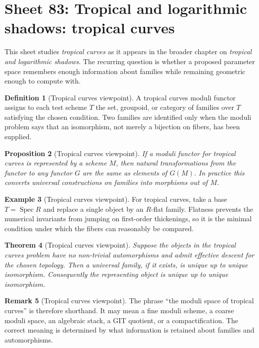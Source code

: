 \documentclass[11pt]{amsart}
\newtheorem{theorem}{Theorem}[section]
\newtheorem{proposition}[theorem]{Proposition}
\theoremstyle{definition}
\newtheorem{definition}[theorem]{Definition}
\newtheorem{example}[theorem]{Example}
\newtheorem{remark}[theorem]{Remark}
\newcommand{\Spec}{\operatorname{Spec}}
\begin{document}
\section{Sheet 83: Tropical and logarithmic shadows: tropical curves}
This sheet studies \emph{tropical curves} as it appears in the broader chapter on \emph{tropical and logarithmic shadows}.  The recurring question is whether a proposed parameter space remembers enough information about families while remaining geometric enough to compute with.
\begin{definition}[Tropical curves viewpoint]
A tropical curves moduli functor assigns to each test scheme $T$ the set, groupoid, or category of families over $T$ satisfying the chosen condition.  Two families are identified only when the moduli problem says that an isomorphism, not merely a bijection on fibers, has been supplied.
\end{definition}
\begin{proposition}[Tropical curves viewpoint]
If a moduli functor for tropical curves is represented by a scheme $M$, then natural transformations from the functor to any functor $G$ are the same as elements of $G(M)$.  In practice this converts universal constructions on families into morphisms out of $M$.
\end{proposition}
\begin{example}[Tropical curves viewpoint]
For tropical curves, take a base $T=\Spec R$ and replace a single object by an $R$-flat family.  Flatness prevents the numerical invariants from jumping on first-order thickenings, so it is the minimal condition under which the fibers can reasonably be compared.
\end{example}
\begin{theorem}[Tropical curves viewpoint]
Suppose the objects in the tropical curves problem have no non-trivial automorphisms and admit effective descent for the chosen topology.  Then a universal family, if it exists, is unique up to unique isomorphism.  Consequently the representing object is unique up to unique isomorphism.
\end{theorem}
\begin{remark}[Tropical curves viewpoint]
The phrase ``the moduli space of tropical curves'' is therefore shorthand.  It may mean a fine moduli scheme, a coarse moduli space, an algebraic stack, a GIT quotient, or a compactification.  The correct meaning is determined by what information is retained about families and automorphisms.
\end{remark}
\end{document}

